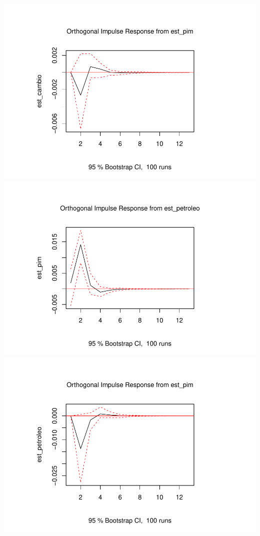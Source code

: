 \documentclass[12pt]{article}
\begin{document}
\includegraphics{artigo_files/figure-latex/unnamed-chunk-14-10.pdf}
\includegraphics{artigo_files/figure-latex/unnamed-chunk-14-11.pdf}
\includegraphics{artigo_files/figure-latex/unnamed-chunk-14-12.pdf}



\end{document}
